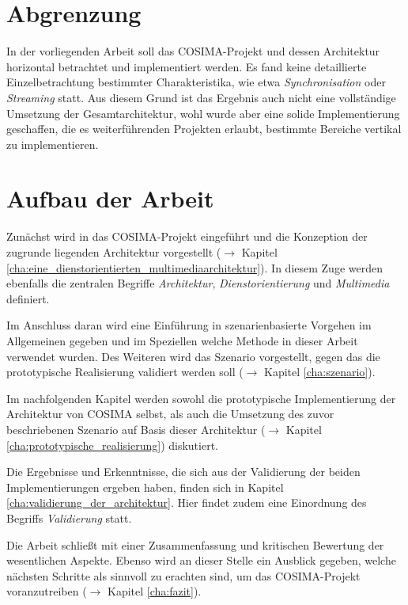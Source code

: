 
\section{Abgrenzung} %
\label{sec:abgrenzung}

  In der vorliegenden Arbeit soll das COSIMA-Projekt und dessen Architektur horizontal betrachtet und implementiert werden. Es fand keine detaillierte Einzelbetrachtung bestimmter Charakteristika, wie etwa \emph{Synchronisation} oder \emph{Streaming} statt. Aus diesem Grund ist das Ergebnis auch nicht eine vollständige Umsetzung der Gesamtarchitektur, wohl wurde aber eine solide Implementierung geschaffen, die es weiterführenden Projekten erlaubt, bestimmte Bereiche vertikal zu implementieren.


\section{Aufbau der Arbeit} %
\label{sec:aufbau_der_arbeit}

  Zunächst wird in das COSIMA-Projekt eingeführt und die Konzeption der zugrunde liegenden Architektur vorgestellt ($\to$ Kapitel \ref{cha:eine_dienstorientierten_multimediaarchitektur}). In diesem Zuge werden ebenfalls die zentralen Begriffe \emph{Architektur}, \emph{Dienstorientierung} und \emph{Multimedia} definiert.
  
  Im Anschluss daran wird eine Einführung in szenarienbasierte Vorgehen im Allgemeinen gegeben und im Speziellen welche Methode in dieser Arbeit verwendet wurden. Des Weiteren wird das Szenario vorgestellt, gegen das die prototypische Realisierung validiert werden soll ($\to$ Kapitel \ref{cha:szenario}).
  
  Im nachfolgenden Kapitel werden sowohl die prototypische Implementierung der Architektur von COSIMA selbst, als auch die Umsetzung des zuvor beschriebenen Szenario auf Basis dieser Architektur ($\to$ Kapitel \ref{cha:prototypische_realisierung}) diskutiert.
  
  Die Ergebnisse und Erkenntnisse, die sich aus der Validierung der beiden Implementierungen ergeben haben, finden sich in Kapitel \ref{cha:validierung_der_architektur}. Hier findet zudem eine Einordnung des Begriffs \emph{Validierung} statt.
  
  Die Arbeit schließt mit einer Zusammenfassung und kritischen Bewertung der wesentlichen Aspekte. Ebenso wird an dieser Stelle ein Ausblick gegeben, welche nächsten Schritte als sinnvoll zu erachten sind, um das COSIMA-Projekt voranzutreiben ($\to$ Kapitel \ref{cha:fazit}).
  

